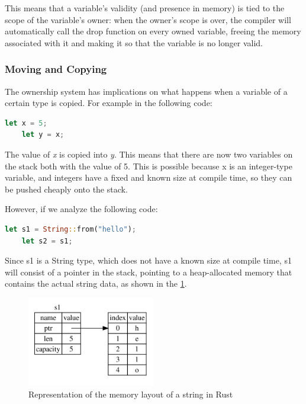 This means that a variable's validity (and presence in memory) is tied to the scope of the variable's owner: when the owner's scope is over, the compiler will automatically
call the drop function on every owned variable, freeing the memory associated with it and making it so that the variable is no longer valid.

\subsubsection{Moving and Copying}
The ownership system has implications on what happens when a variable of a certain type is copied. For example in the following code:

\begin{lstlisting}[language=Rust]
    let x = 5;
    let y = x;
\end{lstlisting}

The value of \textit{x} is copied into \textit{y}. This means that there are now two variables on the stack both with the value of 5. This is possible because x is an integer-type variable,
and integers have a fixed and known size at compile time, so they can be pushed cheaply onto the stack.

However, if we analyze the following code:

\begin{lstlisting}[language=Rust]
    let s1 = String::from("hello");
    let s2 = s1;
\end{lstlisting}

Since s1 is a String type, which does not have a known size at compile time, s1 will consist of a pointer in the stack, pointing to a heap-allocated memory that contains the actual string data, as shown in the \cref{fig:string-memory-rep}.

\begin{figure}[h]
    \centering
    \includegraphics[width=0.5\textwidth]{figures/string-memory-rep.png}
    \caption{Representation of the memory layout of a string in Rust}
    \label{fig:string-memory-rep}
\end{figure}

